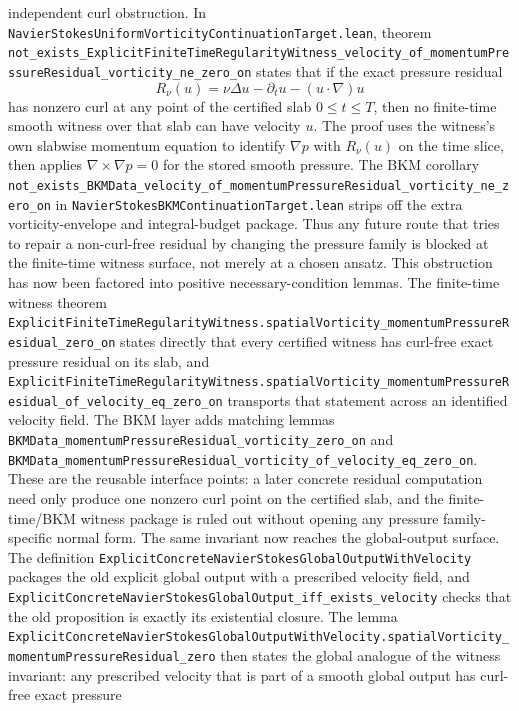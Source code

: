 \documentclass[11pt]{article}
\begin{document}
independent curl obstruction.  In
\texttt{NavierStokesUniformVorticityContinuationTarget.lean}, theorem
\texttt{not\_exists\_ExplicitFiniteTimeRegularityWitness\_velocity\_of\_momentumPressureResidual\_vorticity\_ne\_zero\_on}
states that if the exact pressure residual
\[
  R_\nu(u)=\nu\Delta u-\partial_tu-(u\cdot\nabla)u
\]
has nonzero curl at any point of the certified slab \(0\le t\le T\), then no
finite-time smooth witness over that slab can have velocity \(u\).  The proof
uses the witness's own slabwise momentum equation to identify
\(\nabla p\) with \(R_\nu(u)\) on the time slice, then applies
\(\nabla\times\nabla p=0\) for the stored smooth pressure.  The BKM corollary
\texttt{not\_exists\_BKMData\_velocity\_of\_momentumPressureResidual\_vorticity\_ne\_zero\_on}
in \texttt{NavierStokesBKMContinuationTarget.lean} strips off the extra
vorticity-envelope and integral-budget package.  Thus any future route that
tries to repair a non-curl-free residual by changing the pressure family is
blocked at the finite-time witness surface, not merely at a chosen ansatz.
This obstruction has now been factored into positive necessary-condition
lemmas.  The finite-time witness theorem
\texttt{ExplicitFiniteTimeRegularityWitness.spatialVorticity\_momentumPressureResidual\_zero\_on}
states directly that every certified witness has curl-free exact pressure
residual on its slab, and
\texttt{ExplicitFiniteTimeRegularityWitness.spatialVorticity\_momentumPressureResidual\_of\_velocity\_eq\_zero\_on}
transports that statement across an identified velocity field.  The BKM layer
adds matching lemmas
\texttt{BKMData\_momentumPressureResidual\_vorticity\_zero\_on} and
\texttt{BKMData\_momentumPressureResidual\_vorticity\_of\_velocity\_eq\_zero\_on}.
These are the reusable interface points: a later concrete residual computation
need only produce one nonzero curl point on the certified slab, and the
finite-time/BKM witness package is ruled out without opening any pressure
family-specific normal form.
The same invariant now reaches the global-output surface.  The definition
\texttt{ExplicitConcreteNavierStokesGlobalOutputWithVelocity} packages the
old explicit global output with a prescribed velocity field, and
\texttt{ExplicitConcreteNavierStokesGlobalOutput\_iff\_exists\_velocity}
checks that the old proposition is exactly its existential closure.  The lemma
\texttt{ExplicitConcreteNavierStokesGlobalOutputWithVelocity.spatialVorticity\_momentumPressureResidual\_zero}
then states the global analogue of the witness invariant: any prescribed
velocity that is part of a smooth global output has curl-free exact pressure
\end{document}
